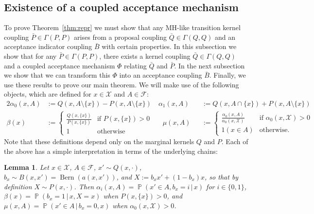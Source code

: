 \documentclass[aihp]{imsart}
\theoremstyle{plain}
\newtheorem{lemma}[theorem]{Lemma}
\theoremstyle{remark}
\theoremstyle{definition} \newtheorem{example}{Example}
\renewcommand{\P}{\operatorname{\mathbb{P}}}
\newcommand{\Bern}{\operatorname{Bern}}
\newcommand{\scrF}{\mathscr{F}}
\newcommand{\calX}{\mathcal{X}}
\newcommand{\g}{\, | \,}
\newcommand{\zo}{\{0,1\}}
\newcommand{\bp}{\bar P}
\newcommand{\bq}{\bar Q}
\newcommand{\bb}{\bar B}
\newcommand{\sx}{\{ x \}}
\begin{document}

\subsection{Existence of a coupled acceptance mechanism}
\label{sec:camexistence}

To prove Theorem~\ref{thm:repr} we must show that any MH-like transition kernel coupling $\bp \in
\Gamma(P,P)$ arises from a proposal coupling $\bq \in \Gamma(Q,Q)$ and an acceptance indicator
coupling $\bb$ with certain properties. In this subsection we show that for any $\bp \in
\Gamma(P,P)$, there exists a kernel coupling $\bq \in \Gamma(Q,Q)$ and a coupled acceptance
mechanism $\Phi$ relating $\bq$ and $\bp$. In the next subsection we show that we can transform this
$\Phi$ into an acceptance coupling $\bb$. Finally, we use these results to prove our main theorem.
We will make use of the following objects, which are defined for $x \in \calX$ and $A \in \scrF$:
\begin{alignat*}{2}
	\alpha_0(x, A) & := Q(x, A \setminus \sx) - P(x, A \setminus \sx) \quad
	\alpha_1(x, A) && := Q(x, A \cap \sx) + P(x, A \setminus \sx) \\
	\beta(x) & :=\begin{cases}
		\frac{Q(x,\sx)}{P(x,\sx)} & \text{if } P(x,\sx) > 0 \\
		1 & \text{otherwise}
	\end{cases}
	\hspace{18pt}
	\mu(x,A) && := \begin{cases}
		\frac{\alpha_0(x,A)}{\alpha_0(x,\calX)} & \text{if } \alpha_0(x,\calX) > 0 \\
		1(x \in A) & \text{otherwise.}
	\end{cases}
\end{alignat*}
Note that these definitions depend only on the marginal kernels $Q$ and $P$. Each of the above has a simple
interpretation in terms of the underlying chains:

\smallskip

\begin{lemma}
\label{lem:qualitative}
Let $x \in \calX$, $A \in \scrF$, $x' \sim Q(x, \cdot)$, $b_x \sim B(x,x') = \Bern(a(x,x'))$,
and ${X := b_x x' + (1-b_x) x}$,
so that by definition
$X \sim P(x, \cdot)$.
Then $\alpha_i(x, A) = \P(x' \in A, b_x=i \g x)$ for $i \in \zo$, $\beta(x) = \P(b_x = 1 \g x,
X=x)$ when $P(x, \sx) > 0$, and $\mu(x, A) = \P(x' \in A \g b_x = 0, x)$ when
$\alpha_0(x,\calX)>0$.
\end{lemma}
\end{document}
